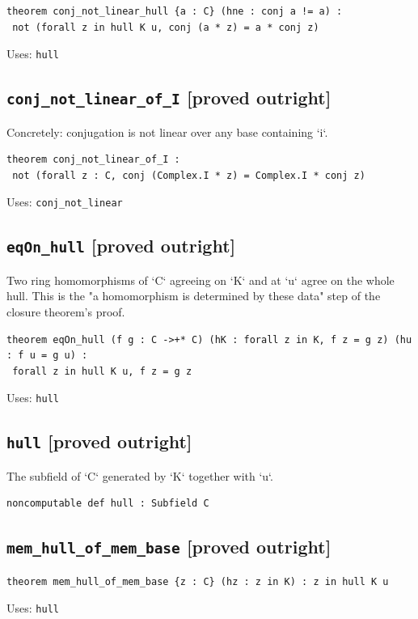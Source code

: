 \documentclass[11pt,a4paper]{article}
\newcommand{\tagpr}{\textcolor{provedc}{\textbf{[proved outright]}}}
\begin{document}
\begin{lstlisting}
theorem conj_not_linear_hull {a : C} (hne : conj a != a) :
 not (forall z in hull K u, conj (a * z) = a * conj z)
\end{lstlisting}
\noindent\footnotesize Uses: \texttt{hull}\normalsize


\subsection*{\texttt{conj\_not\_linear\_of\_I} \hfill \tagpr}

Concretely: conjugation is not linear over any base containing `i`.

\begin{lstlisting}
theorem conj_not_linear_of_I :
 not (forall z : C, conj (Complex.I * z) = Complex.I * conj z)
\end{lstlisting}
\noindent\footnotesize Uses: \texttt{conj\_not\_linear}\normalsize


\subsection*{\texttt{eqOn\_hull} \hfill \tagpr}

Two ring homomorphisms of `C` agreeing on `K` and at `u` agree on the whole hull. This is the "a homomorphism is determined by these data" step of the closure theorem's proof.

\begin{lstlisting}
theorem eqOn_hull (f g : C ->+* C) (hK : forall z in K, f z = g z) (hu : f u = g u) :
 forall z in hull K u, f z = g z
\end{lstlisting}
\noindent\footnotesize Uses: \texttt{hull}\normalsize


\subsection*{\texttt{hull} \hfill \tagpr}

The subfield of `C` generated by `K` together with `u`.

\begin{lstlisting}
noncomputable def hull : Subfield C
\end{lstlisting}

\subsection*{\texttt{mem\_hull\_of\_mem\_base} \hfill \tagpr}
\begin{lstlisting}
theorem mem_hull_of_mem_base {z : C} (hz : z in K) : z in hull K u
\end{lstlisting}
\noindent\footnotesize Uses: \texttt{hull}\normalsize
\end{document}
